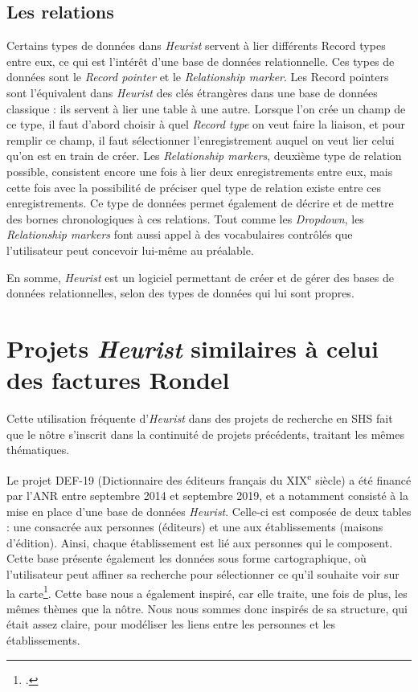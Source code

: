 \subsection{Les relations}

Certains types de données dans \emph{Heurist} servent à lier différents Record types entre eux, ce qui est l'intérêt d'une base de données relationnelle. Ces types de données sont le \emph{Record pointer} et le \emph{Relationship marker}. Les Record pointers sont l'équivalent dans \emph{Heurist} des clés étrangères dans une base de données classique : ils servent à lier une table à une autre. Lorsque l'on crée un champ de ce type, il faut d'abord choisir à quel \emph{Record type} on veut faire la liaison, et pour remplir ce champ, il faut sélectionner l'enregistrement auquel on veut lier celui qu'on est en train de créer. Les \emph{Relationship markers}, deuxième type de relation possible, consistent encore une fois à lier deux enregistrements entre eux, mais cette fois avec la possibilité de préciser quel type de relation existe entre ces enregistrements. Ce type de données permet également de décrire et de mettre des bornes chronologiques à ces relations. Tout comme les \emph{Dropdown}, les \emph{Relationship markers} font aussi appel à des vocabulaires contrôlés que l'utilisateur peut concevoir lui-même au préalable. 

En somme, \emph{Heurist} est un logiciel permettant de créer et de gérer des bases de données relationnelles, selon des types de données qui lui sont propres. 

\section{Projets \emph{Heurist} similaires à celui des factures Rondel}

Cette utilisation fréquente d'\emph{Heurist} dans des projets de recherche en SHS fait que le nôtre s'inscrit dans la continuité de projets précédents, traitant les mêmes thématiques. 

Le projet DEF-19 (Dictionnaire des éditeurs français du XIX\textsuperscript{e} siècle) a été financé par l'ANR entre septembre 2014 et septembre 2019, et a notamment consisté à la mise en place d'une base de données \emph{Heurist}. Celle-ci est composée de deux tables : une consacrée aux personnes (éditeurs) et une aux établissements (maisons d'édition). Ainsi, chaque établissement est lié aux personnes qui le composent. Cette base présente également les données sous forme cartographique, où l'utilisateur peut affiner sa recherche pour sélectionner ce qu'il souhaite voir sur la carte\footcite{noauthor_dictionnaire_nodate}. Cette base nous a également inspiré, car elle traite, une fois de plus, les mêmes thèmes que la nôtre. Nous nous sommes donc inspirés de sa structure, qui était assez claire, pour modéliser les liens entre les personnes et les établissements. 

